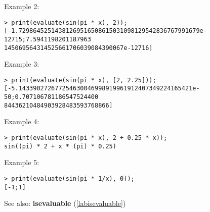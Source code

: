\noindent Example 2: 
\begin{center}\begin{minipage}{15cm}\begin{Verbatim}[frame=single]
> print(evaluate(sin(pi * x), 2));
[-1.72986452514381269516508615031098129542836767991679e-12715;7.5941198201187963
145069564314525661706039084390067e-12716]
\end{Verbatim}
\end{minipage}\end{center}
\noindent Example 3: 
\begin{center}\begin{minipage}{15cm}\begin{Verbatim}[frame=single]
> print(evaluate(sin(pi * x), [2, 2.25]));
[-5.143390272677254630046998919961912407349224165421e-50;0.707106781186547524400
84436210484903928483593768866]
\end{Verbatim}
\end{minipage}\end{center}
\noindent Example 4: 
\begin{center}\begin{minipage}{15cm}\begin{Verbatim}[frame=single]
> print(evaluate(sin(pi * x), 2 + 0.25 * x));
sin((pi) * 2 + x * (pi) * 0.25)
\end{Verbatim}
\end{minipage}\end{center}
\noindent Example 5: 
\begin{center}\begin{minipage}{15cm}\begin{Verbatim}[frame=single]
> print(evaluate(sin(pi * 1/x), 0));
[-1;1]
\end{Verbatim}
\end{minipage}\end{center}
See also: \textbf{isevaluable} (\ref{labisevaluable})
